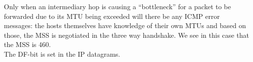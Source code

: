 Only when an intermediary hop is causing a ``bottleneck'' for a packet to be forwarded due to its MTU being exceeded will there be any ICMP error messages: the hosts themselves have knowledge of their own MTUs and based on those, the MSS is negotiated in the three way handshake. We see in this case that the MSS is 460. \\

\iffalse
This size is respected by all of the packets in the nttcp transmission, so no ICMP error message was generated. \\
\fi

The DF-bit is set in the IP datagrams.
